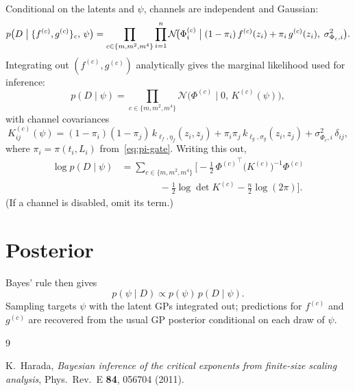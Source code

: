 \documentclass[11pt]{article}
\begin{document}
Conditional on the latents and $\psi$, channels are independent and
Gaussian:
\begin{equation}
  p\bigl(D \bigm| \{f^{(c)},g^{(c)}\}_c,\, \psi\bigr)
    = \prod_{c\in\{m,m^2,m^4\}}
      \prod_{i=1}^{n}
      \mathcal{N}\!\bigl(
        \Phi^{(c)}_i \;\big|\;
        (1-\pi_i)\, f^{(c)}(z_i) + \pi_i\, g^{(c)}(z_i),\;
        \sigma_{\Phi_c,i}^2
      \bigr).
\end{equation}
Integrating out $(f^{(c)},g^{(c)})$ analytically gives the marginal
likelihood used for inference:
\begin{equation}
  p(D\mid\psi)
    = \prod_{c\in\{m,m^2,m^4\}}
      \mathcal{N}\!\bigl(\Phi^{(c)} \;\big|\; 0,\, K^{(c)}(\psi)\bigr),
\end{equation}
with channel covariances
\begin{equation}
  \label{eq:K-mixture}
  K^{(c)}_{ij}(\psi)
    = (1-\pi_i)(1-\pi_j)\, k_{\ell_f,\eta_f}(z_i,z_j)
      + \pi_i\pi_j\, k_{\ell_g,\sigma_g}(z_i,z_j)
      + \sigma_{\Phi_c,i}^2\, \delta_{ij},
\end{equation}
where $\pi_i = \pi(t_i,L_i)$ from~\eqref{eq:pi-gate}.
Writing this out,
\begin{align}
  \log p(D\mid\psi)
    &= \sum_{c\in\{m,m^2,m^4\}}
      \Biggl[
        -\tfrac12\, {\Phi^{(c)}}^\top
          \bigl(K^{(c)}\bigr)^{-1} \Phi^{(c)}
  \nonumber\\
    &\qquad\qquad
        -\tfrac12\log\det K^{(c)}
        -\tfrac{n}{2}\log(2\pi)
      \Biggr].
\end{align}
(If a channel is disabled, omit its term.)

\section{Posterior}

Bayes' rule then gives
\begin{equation}
  p(\psi\mid D)
    \propto
    p(\psi)\, p(D\mid\psi).
\end{equation}
Sampling targets $\psi$ with the latent GPs integrated out; predictions
for $f^{(c)}$ and $g^{(c)}$ are recovered from the usual GP posterior
conditional on each draw of $\psi$.

\begin{thebibliography}{9}

  K.~Harada,
  \emph{Bayesian inference of the critical exponents from finite-size
  scaling analysis},
  Phys.\ Rev.\ E \textbf{84}, 056704 (2011).

\end{thebibliography}
\end{document}
